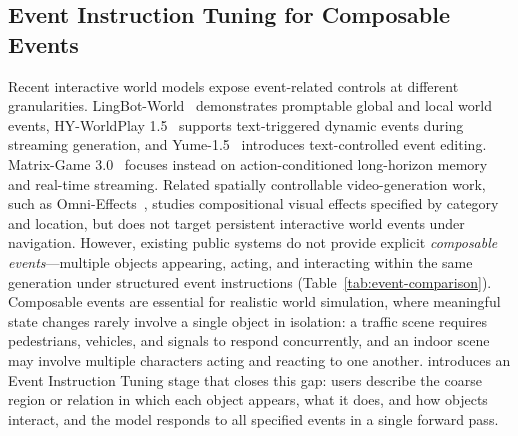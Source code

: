 \subsection{Event Instruction Tuning for Composable Events}

Recent interactive world models expose event-related controls at different
granularities.
LingBot-World~\citep{gao2026lingbotworld} demonstrates promptable global and
local world events, HY-WorldPlay 1.5~\citep{hyworld2025,sun2025worldplay}
supports text-triggered dynamic events during streaming generation, and
Yume-1.5~\citep{mao2025yume15} introduces text-controlled event editing.
Matrix-Game 3.0~\citep{wang2026matrixgame} focuses instead on action-conditioned
long-horizon memory and real-time streaming.
Related spatially controllable video-generation work, such as
Omni-Effects~\citep{mao2025omnieffects}, studies compositional visual effects
specified by category and location, but does not target persistent interactive
world events under navigation.
However, existing public systems do not provide explicit \emph{composable
events}---multiple objects appearing, acting, and interacting within the same
generation under structured event instructions
(Table~\ref{tab:event-comparison}).
Composable events are essential for realistic world simulation, where
meaningful state changes rarely involve a single object in isolation:
a traffic scene requires pedestrians, vehicles, and signals to respond
concurrently, and an indoor scene may involve multiple characters acting and
reacting to one another.
\method{} introduces an Event Instruction Tuning stage that closes this gap:
users describe the coarse region or relation in which each object appears,
what it does, and how objects interact, and the model responds to all specified
events in a single forward pass.

